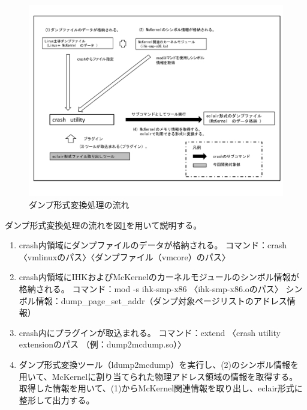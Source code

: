 \documentclass[twoside,11pt,fleqn]{book}
\begin{document}
\subsection{}
\begin{figure}[!ht]
  \includegraphics[scale=0.6]{figs/chap01_fig005.pdf}
  \caption{ダンプ形式変換処理の流れ}
  \label{figure:chap01_fig005}
\end{figure}
\FloatBarrier
%
ダンプ形式変換処理の流れを図\ref{figure:chap01_fig005}を用いて説明する。 
\begin{enumerate}
\renewcommand{\labelenumi}{(\arabic{enumi})}
\item crash内領域にダンプファイルのデータが格納される。\newline
コマンド：crash 〈vmlinuxのパス〉〈ダンプファイル（vmcore）のパス〉
\item crash内領域にIHKおよびMcKernelのカーネルモジュールのシンボル情報が格納される。\newline
コマンド：mod -s ihk-smp-x86 〈ihk-smp-x86.oのパス〉\newline
シンボル情報：dump\_page\_set\_addr（ダンプ対象ページリストのアドレス情報）
\item crash内にプラグインが取込まれる。\newline
コマンド：extend 〈crash utility extensionのパス （例：dump2mcdump.so）〉
\item ダンプ形式変換ツール（ldump2mcdump）を実行し、(2)のシンボル情報を用いて、McKernelに割り当てられた物理アドレス領域の情報を取得する。\newline
取得した情報を用いて、(1)からMcKernel関連情報を取り出し、eclair形式に整形して出力する。
\end{enumerate}
\end{document}
